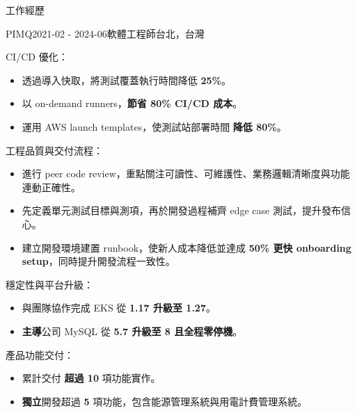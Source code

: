 \documentclass[
	11pt,
]{resume}
\newenvironment{myitemize}
  {\begin{itemize}
    \setlength{\itemsep}{-0.5em} \vspace{-0.5em}
  }
  {\end{itemize}}
\begin{document}
\begin{rSection}{工作經歷}
	\begin{rSubsection}{PIMQ}{2021-02 - 2024-06}{軟體工程師}{台北，台灣}
    \item CI/CD 優化：
    \begin{myitemize}
      \item 透過導入快取，將測試覆蓋執行時間降低 \textbf{25\%}。
      \item 以 on-demand runners，\textbf{節省 80\% CI/CD 成本}。
      \item 運用 AWS launch templates，使測試站部署時間 \textbf{降低 80\%}。
    \end{myitemize}
    \item 工程品質與交付流程：
    \begin{myitemize}
      \item 進行 peer code review，重點關注可讀性、可維護性、業務邏輯清晰度與功能連動正確性。
      \item 先定義單元測試目標與測項，再於開發過程補齊 edge case 測試，提升發布信心。
      \item 建立開發環境建置 runbook，使新人成本降低並達成 \textbf{50\% 更快 onboarding setup}，同時提升開發流程一致性。
    \end{myitemize}
    \item 穩定性與平台升級：
    \begin{myitemize}
      \item 與團隊協作完成 EKS 從 \textbf{1.17 升級至 1.27}。
      \item \textbf{主導}公司 MySQL 從 \textbf{5.7 升級至 8 且全程零停機}。
    \end{myitemize}
    \item 產品功能交付：
    \begin{myitemize}
      \item 累計交付 \textbf{超過 10} 項功能實作。
      \item \textbf{獨立}開發超過 \textbf{5} 項功能，包含能源管理系統與用電計費管理系統。
    \end{myitemize}
  \end{rSubsection}

\end{rSection}

\end{document}
